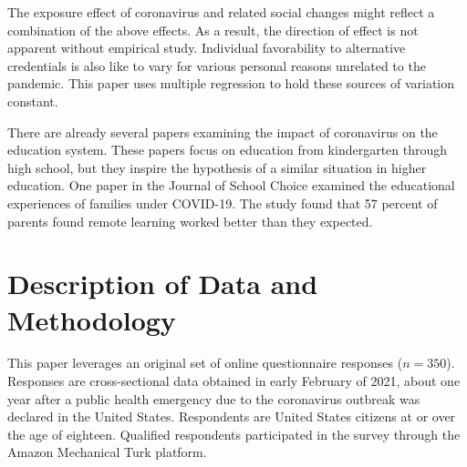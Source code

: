 \documentclass[review]{elsarticle}
\begin{document}
The exposure effect of coronavirus and related social changes might reflect a combination of the above effects.
As a result, the direction of effect is not apparent without empirical study.
Individual favorability to alternative credentials is also like to vary for various personal reasons unrelated to the pandemic.
This paper uses multiple regression to hold these sources of variation constant.

There are already several papers examining the impact of coronavirus on the education system.
These papers focus on education from kindergarten through high school,
but they inspire the hypothesis of a similar situation in higher education.
One paper in the Journal of School Choice examined the educational experiences of families under COVID-19\cite{carpenter2020we}.
The study found that 57 percent of parents found remote learning worked better than they expected.


\section{Description of Data and Methodology}

This paper leverages an original set of online questionnaire responses ($n = 350$).
Responses are cross-sectional data obtained in early February of 2021,
about one year after a public health emergency due to the coronavirus outbreak was declared in the United States\cite{staff_2021}.
Respondents are United States citizens at or over the age of eighteen.
Qualified respondents participated in the survey through the Amazon Mechanical Turk platform.
\end{document}

